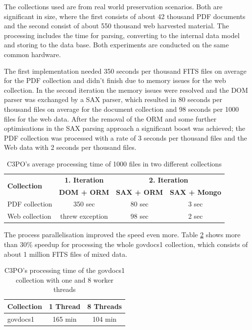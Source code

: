 The collections used are from real world preservation scenarios. Both are significant in size, where the first consists of about 42 thousand PDF documents and the second consist of about 550 thousand web harvested material. The processing includes the time for parsing, converting to the internal data model and storing to the data base. Both experiments are conducted on the same common hardware.

The first implementation needed 350 seconds per thousand FITS files on average for the PDF collection and didn't finish due to memory issues for the web collection. In the second iteration the memory issues were resolved and the DOM parser was exchanged by a SAX parser, which resulted in 80 seconds per thousand files on average for the document collection and 98 seconds per 1000 files for the web data. After the removal of the ORM and some further optimisations in the SAX parsing approach a significant boost was achieved; the PDF collection was processed with a rate of 3 seconds per thousand files and the Web data with 2 seconds per thousand files.

\begin{table}[h]
\centering
\begin{tabular}{l || c | c | c}
\hline
\multirow{2}{*}{\textbf{Collection}} &  \textbf{1. Iteration} & \multicolumn{2}{c}{\textbf{2. Iteration}} \\
                    & \textbf{DOM + ORM} & \textbf{SAX + ORM} & \textbf{SAX + Mongo} \\
\hline
PDF collection & 350 sec  & 80 sec & 3 sec \\
\hline
Web collection & threw exception & 98 sec & 2 sec \\
\hline
\end{tabular}
\caption{C3PO's average processing time of 1000 files in two different collections}
\label{tab:iterations_performance_metrics}
\end{table}

The process parallelisation improved the speed even more. Table \ref{tab:parallel_performance_metrics} shows
more than 30\% speedup for processing the whole govdocs1 collection, which consists of about 1 million FITS files of mixed data.

\begin{table}[h]
\centering
\begin{tabular}{l || c | c}
\hline
\textbf{Collection} & \textbf{1 Thread} & \textbf{8 Threads} \\
\hline
govdocs1 & 165 min & 104 min \\
\hline
\end{tabular}
\caption{C3PO's processing time of the govdocs1 collection with one and 8 worker threads}
\label{tab:parallel_performance_metrics}
\end{table}

